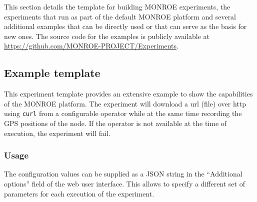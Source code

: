 \documentclass[a4paper,10pt]{article}
\newcommand{\monroe}{MONROE}
\newcommand{\identifier}[1]{{\texttt{\small{#1}}}}
\begin{document}
This section details the template for building \monroe{} experiments, the experiments that run as part of the default \monroe{} platform and several additional examples that can be directly used or that can serve as the basis for new ones.
The source code for the examples is publicly available at \url{https://github.com/MONROE-PROJECT/Experiments}.


\subsection{Example template}

This experiment template provides an extensive example to show the capabilities of the \monroe{} platform.
The experiment will download a url (file) over http using \identifier{curl} from a configurable operator while at the same time recording the GPS positions of the node.
If the operator is not available at the time of execution, the experiment will fail.

\subsubsection{Usage}
\label{subsubsec:templateUsage}


The configuration values can be supplied as a JSON string in the ``Additional options'' field of the web user interface.
This allows to specify a different set of parameters for each execution of the experiment.
\end{document}
